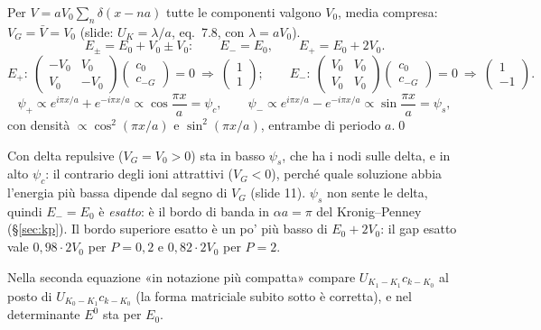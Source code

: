\documentclass[11pt,a4paper]{article}
\begin{document}
\begin{dimostrazione}
Per $V=aV_0\sum_n\delta(x-na)$ tutte le componenti valgono $V_0$, media compresa: $V_G=\bar V=V_0$ (slide: $U_K=\lambda/a$, eq.~7.8, con $\lambda=aV_0$).
\[
E_\pm=E_0+V_0\pm V_0 :\qquad E_-=E_0,\qquad E_+=E_0+2V_0 .
\]
\[
E_+:\ \begin{pmatrix}-V_0&V_0\\V_0&-V_0\end{pmatrix}\begin{pmatrix}c_0\\c_{-G}\end{pmatrix}=0\ \Rightarrow\ \begin{pmatrix}1\\1\end{pmatrix};\qquad
E_-:\ \begin{pmatrix}V_0&V_0\\V_0&V_0\end{pmatrix}\begin{pmatrix}c_0\\c_{-G}\end{pmatrix}=0\ \Rightarrow\ \begin{pmatrix}1\\-1\end{pmatrix}.
\]
\[
\psi_+\propto e^{i\pi x/a}+e^{-i\pi x/a}\propto\cos\frac{\pi x}a=\psi_c,\qquad\psi_-\propto e^{i\pi x/a}-e^{-i\pi x/a}\propto\sin\frac{\pi x}a=\psi_s,
\]
con densità $\propto\cos^2(\pi x/a)$ e $\sin^2(\pi x/a)$, entrambe di periodo $a$.\qed
\end{dimostrazione}
\begin{interpretazione}
Con delta repulsive ($V_G=V_0>0$) sta in basso $\psi_s$, che ha i nodi sulle delta, e in alto $\psi_c$: il contrario degli ioni attrattivi ($V_G<0$), perché
quale soluzione abbia l'energia più bassa dipende dal segno di $V_G$ (slide 11). $\psi_s$ non sente le delta, quindi $E_-=E_0$ è \emph{esatto}: è il
bordo di banda in $\alpha a=\pi$ del Kronig--Penney (§\ref{sec:kp}). Il bordo superiore esatto è un po' più basso di $E_0+2V_0$: il gap esatto vale
$0{,}98\cdot2V_0$ per $P=0{,}2$ e $0{,}82\cdot2V_0$ per $P=2$.
\end{interpretazione}
\begin{osservazione}
Nella seconda equazione «in notazione più compatta» compare $U_{K_1-K_1}c_{k-K_0}$ al posto di $U_{K_0-K_1}c_{k-K_0}$ (la forma matriciale subito sotto è
corretta), e nel determinante $E^0$ sta per $E_0$.
\end{osservazione}
\end{document}

